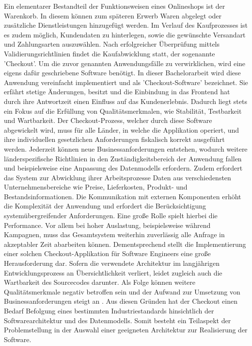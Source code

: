 Ein elementarer Bestandteil der Funktionsweisen eines Onlineshops ist der Warenkorb. In diesem können zum späteren Erwerb Waren abgelegt oder zusätzliche Dienstleistungen hinzugefügt werden. Im Verlauf des Kaufprozesses ist es zudem möglich, Kundendaten zu hinterlegen, sowie die gewünschte Versandart und Zahlungsarten auszuwählen. Nach erfolgreicher Überprüfung mittels Validierungsrichtlinien findet die Kaufabwicklung statt, der sogenannte 'Checkout'. Um die zuvor genannten Anwendungsfälle zu verwirklichen, wird eine eigens dafür geschriebene Software benötigt. In dieser Bachelorarbeit wird diese Anwendung vereinfacht implementiert und als 'Checkout-Software' bezeichnet. Sie erfährt stetige Änderungen, besitzt  und die Einbindung in das Frontend hat durch ihre Antwortzeit einen Einfluss auf das Kundenerlebnis. Dadurch liegt stets ein Fokus auf die Erfüllung von Qualitätsmerkmalen, wie Stabilität, Testbarkeit und Wartbarkeit. Der Checkout-Prozess, welcher durch diese Software abgewickelt wird, muss für alle Länder, in welche die Applikation operiert, und ihre individuellen gesetzlichen Anforderungen fiskalisch korrekt ausgeführt werden. Jederzeit können neue Businessanforderungen entstehen, wodurch weitere länderspezifische Richtlinien in den Zuständigkeitsbereich der Anwendung fallen und beispielsweise eine Anpassung des Datenmodells erfordern. Zudem erfordert das System zur Abwicklung ihrer Arbeitsprozesse Daten aus verschiedensten Unternehmensbereiche wie Preise, Lieferkosten, Produkt- und Bestandsinformationen. Die Kommunikation mit externen Komponenten erhöht die Komplexität der Anwendung und erfordert die Berücksichtigung systemübergreifender Anforderungen. Eine große Rolle spielt hierbei die Performance. Vor allem bei hoher Auslastung, beispielsweise während Kampagnen, muss das Gesamtsystem weiterhin zuverlässig alle Anfrage in akzeptabler Zeit abarbeiten können. Dementsprechend stellt die Implementierung einer solchen Checkout-Applikation für Software Engineers eine große Herausforderung dar. Sofern die verwendete Architektur im langjährigen Entwicklungsprozess an Übersichtlichkeit verliert, leidet zugleich auch die Wartbarkeit des Sourcecodes darunter. Als Folge können weitere Qualitätsmerkmale negativ betroffen sein und der Aufwand zur Umsetzung von Businessanforderungen steigt an \cite[S. 3f.]{Pigoski.2001}. Aus diesen Gründen hat der Checkout einen Bedarf  Befolgung eines bestimmten Industriestandards hinsichtlich der Softwarearchitektur und des Datenmodells. Somit besteht ein Teilaspekt der Problemstellung in der Auswahl einer geeigneten Architektur zur Realisierung der Software. 

